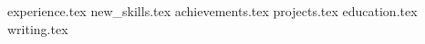 \documentclass[11pt, a4paper]{awesome-cv}
\newcommand*{\sectiondir}{resume/}
\begin{document}
\makecvheader

{experience.tex}
{new_skills.tex}
{achievements.tex}
{projects.tex}
{education.tex}
{writing.tex}
\end{document}
